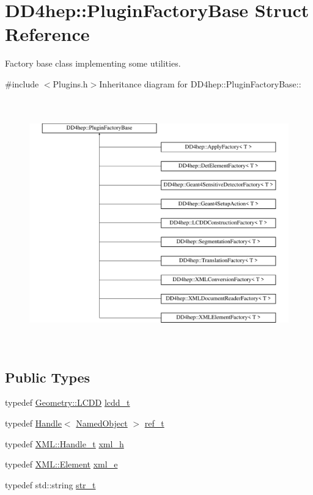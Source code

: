 \hypertarget{struct_d_d4hep_1_1_plugin_factory_base}{
\section{DD4hep::PluginFactoryBase Struct Reference}
\label{struct_d_d4hep_1_1_plugin_factory_base}
}


Factory base class implementing some utilities.  


{\ttfamily \#include $<$Plugins.h$>$}Inheritance diagram for DD4hep::PluginFactoryBase::\begin{figure}[H]
\begin{center}
\leavevmode
\includegraphics[height=10.7692cm]{struct_d_d4hep_1_1_plugin_factory_base}
\end{center}
\end{figure}
\subsection*{Public Types}
\begin{DoxyCompactItemize}
\item 
typedef \hyperlink{class_d_d4hep_1_1_geometry_1_1_l_c_d_d}{Geometry::LCDD} \hyperlink{struct_d_d4hep_1_1_plugin_factory_base_a61b840cc18cdd24ae2e383da306b9c9a}{lcdd\_\-t}
\item 
typedef \hyperlink{class_d_d4hep_1_1_handle}{Handle}$<$ \hyperlink{class_d_d4hep_1_1_named_object}{NamedObject} $>$ \hyperlink{struct_d_d4hep_1_1_plugin_factory_base_ab13458952a5b4a91f5130d3ee4db4d33}{ref\_\-t}
\item 
typedef \hyperlink{class_d_d4hep_1_1_x_m_l_1_1_handle__t}{XML::Handle\_\-t} \hyperlink{struct_d_d4hep_1_1_plugin_factory_base_aedebe6835e2705756763812545bcb8fd}{xml\_\-h}
\item 
typedef \hyperlink{class_d_d4hep_1_1_x_m_l_1_1_element}{XML::Element} \hyperlink{struct_d_d4hep_1_1_plugin_factory_base_a4fd06e29fc55de37e856b2a72831d50e}{xml\_\-e}
\item 
typedef std::string \hyperlink{struct_d_d4hep_1_1_plugin_factory_base_aaa4c6d8801f70db2776c5473abc92692}{str\_\-t}
\end{DoxyCompactItemize}
